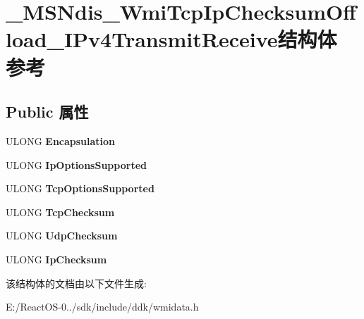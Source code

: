 \hypertarget{struct___m_s_ndis___wmi_tcp_ip_checksum_offload___i_pv4_transmit_receive}{}\section{\+\_\+\+M\+S\+Ndis\+\_\+\+Wmi\+Tcp\+Ip\+Checksum\+Offload\+\_\+\+I\+Pv4\+Transmit\+Receive结构体 参考}
\label{struct___m_s_ndis___wmi_tcp_ip_checksum_offload___i_pv4_transmit_receive}
\subsection*{Public 属性}
\begin{DoxyCompactItemize}
\item 
\mbox{\label{struct___m_s_ndis___wmi_tcp_ip_checksum_offload___i_pv4_transmit_receive_a2457d679f54162517203305abd9b83bf}} 
U\+L\+O\+NG {\bfseries Encapsulation}
\item 
\mbox{\label{struct___m_s_ndis___wmi_tcp_ip_checksum_offload___i_pv4_transmit_receive_a0b3fef011a927aa45fa0357e310c082f}} 
U\+L\+O\+NG {\bfseries Ip\+Options\+Supported}
\item 
\mbox{\label{struct___m_s_ndis___wmi_tcp_ip_checksum_offload___i_pv4_transmit_receive_a2472c68e57c906e5fa41b6cbedcc18e5}} 
U\+L\+O\+NG {\bfseries Tcp\+Options\+Supported}
\item 
\mbox{\label{struct___m_s_ndis___wmi_tcp_ip_checksum_offload___i_pv4_transmit_receive_aaab14a6b7ee16c4af514993d46e9f764}} 
U\+L\+O\+NG {\bfseries Tcp\+Checksum}
\item 
\mbox{\label{struct___m_s_ndis___wmi_tcp_ip_checksum_offload___i_pv4_transmit_receive_a9acfdabeb57703404bc92dadcbc7794a}} 
U\+L\+O\+NG {\bfseries Udp\+Checksum}
\item 
\mbox{\label{struct___m_s_ndis___wmi_tcp_ip_checksum_offload___i_pv4_transmit_receive_a8d7755abd2a26e88edc5eed6d702ccc9}} 
U\+L\+O\+NG {\bfseries Ip\+Checksum}
\end{DoxyCompactItemize}


该结构体的文档由以下文件生成\+:\begin{DoxyCompactItemize}
\item 
E\+:/\+React\+O\+S-\/0../sdk/include/ddk/wmidata.\+h\end{DoxyCompactItemize}
